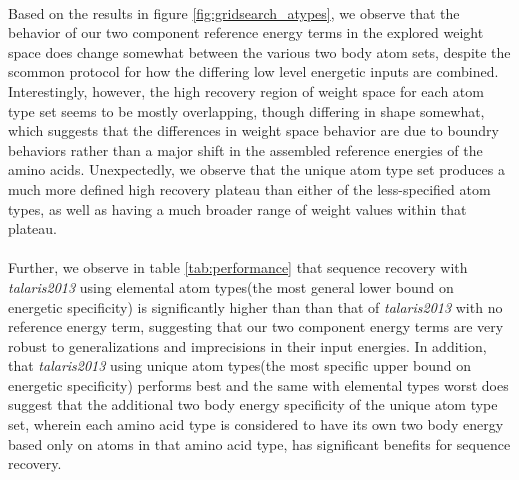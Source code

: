 \paragraph{}
Based on the results in figure \ref{fig:gridsearch_atypes}, we observe that the behavior of our two component reference energy terms in the explored weight space does change somewhat between the various two body atom sets, despite the scommon protocol for how the differing low level energetic inputs are combined.
Interestingly, however, the high recovery region of weight space for each atom type set seems to be mostly overlapping, though differing in shape somewhat, which suggests that the differences in weight space behavior are due to boundry behaviors rather than a major shift in the assembled reference energies of the amino acids.
Unexpectedly, we observe that the unique atom type set produces a much more defined high recovery plateau than either of the less-specified atom types, as well as having a much broader range of weight values within that plateau.

\paragraph{}
Further, we observe in table \ref{tab:performance} that sequence recovery with \textit{talaris2013} using elemental atom types(the most general lower bound on energetic specificity) is significantly higher than than that of \textit{talaris2013} with no reference energy term, suggesting that our two component energy terms are very robust to generalizations and imprecisions in their input energies.
In addition, that \textit{talaris2013} using unique atom types(the most specific upper bound on energetic specificity) performs best and the same with elemental types worst does suggest that the additional two body energy specificity of the unique atom type set, wherein each amino acid type is considered to have its own two body energy based only on atoms in that amino acid type, has significant benefits for sequence recovery.

